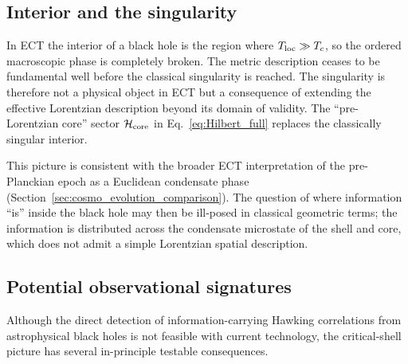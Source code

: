\documentclass[11pt,a4paper]{article}
\numberwithin{equation}{section}
\begin{document}
\subsection{Interior and the singularity}
\label{app:interior}

In ECT the interior of a black hole is the region where
$T_{\rm loc}\gg T_c$, so the ordered macroscopic phase is completely broken.
The metric description ceases to be fundamental well before the classical
singularity is reached.
The singularity is therefore not a physical object in ECT but a consequence
of extending the effective Lorentzian description beyond its domain of validity.
The ``pre-Lorentzian core'' sector $\mathcal{H}_{\rm core}$ in
Eq.~\eqref{eq:Hilbert_full} replaces the classically singular interior.

This picture is consistent with the broader ECT interpretation of the
pre-Planckian epoch as a Euclidean condensate phase
(Section~\ref{sec:cosmo_evolution_comparison}).
The question of where information ``is'' inside the black hole may then be
ill-posed in classical geometric terms; the information is distributed across
the condensate microstate of the shell and core, which does not admit a simple
Lorentzian spatial description.

\subsection{Potential observational signatures}
\label{app:bh_obs}

Although the direct detection of information-carrying Hawking correlations
from astrophysical black holes is not feasible with current technology,
the critical-shell picture has several in-principle testable consequences.
\end{document}

